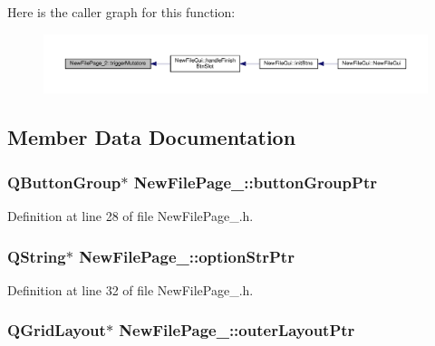 Here is the caller graph for this function\-:
\nopagebreak
\begin{figure}[H]
\begin{center}
\leavevmode
\includegraphics[width=350pt]{class_new_file_page__2_aa680bc4e087b98dbc1d69ee918a0cd24_icgraph}
\end{center}
\end{figure}




\subsection{Member Data Documentation}
\hypertarget{class_new_file_page__2_a1eaed1480c571a3bb321bc13707056c8}{
\subsubsection[{button\-Group\-Ptr}]{\setlength{\rightskip}{0pt plus 5cm}Q\-Button\-Group$\ast$ New\-File\-Page\-\_\-::button\-Group\-Ptr\hspace{0.3cm}{\ttfamily [private]}}}\label{class_new_file_page__2_a1eaed1480c571a3bb321bc13707056c8}


Definition at line 28 of file New\-File\-Page\-\_.\-h.

\hypertarget{class_new_file_page__2_a8be9fd0cc47bdaa93967f604d8ca081a}{
\subsubsection[{option\-Str\-Ptr}]{\setlength{\rightskip}{0pt plus 5cm}Q\-String$\ast$ New\-File\-Page\-\_\-::option\-Str\-Ptr\hspace{0.3cm}{\ttfamily [private]}}}\label{class_new_file_page__2_a8be9fd0cc47bdaa93967f604d8ca081a}


Definition at line 32 of file New\-File\-Page\-\_.\-h.

\hypertarget{class_new_file_page__2_aeebed0ee7d06690f79843b0b926e937c}{
\subsubsection[{outer\-Layout\-Ptr}]{\setlength{\rightskip}{0pt plus 5cm}Q\-Grid\-Layout$\ast$ New\-File\-Page\-\_\-::outer\-Layout\-Ptr\hspace{0.3cm}{\ttfamily [private]}}}\label{class_new_file_page__2_aeebed0ee7d06690f79843b0b926e937c}


